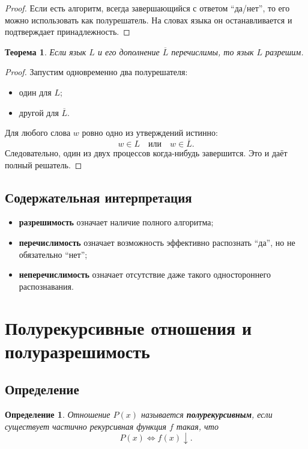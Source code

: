 \documentclass[12pt,a4paper]{article}
\newtheorem{definition}{Определение}
\newtheorem{theorem}{Теорема}
\begin{document}
\begin{proof}
Если есть алгоритм, всегда завершающийся с ответом ``да/нет'', то его можно использовать как полурешатель. На словах языка он останавливается и подтверждает принадлежность.
\end{proof}

\begin{theorem}
Если язык $L$ и его дополнение $\overline L$ перечислимы, то язык $L$ разрешим.
\end{theorem}

\begin{proof}
Запустим одновременно два полурешателя:
\begin{itemize}
    \item один для $L$;
    \item другой для $\overline L$.
\end{itemize}
Для любого слова $w$ ровно одно из утверждений истинно:
\[
w\in L \quad \text{или} \quad w\in \overline L.
\]
Следовательно, один из двух процессов когда-нибудь завершится. Это и даёт полный решатель.
\end{proof}

\subsection{Содержательная интерпретация}
\begin{itemize}
    \item \textbf{разрешимость} означает наличие полного алгоритма;
    \item \textbf{перечислимость} означает возможность эффективно распознать ``да'', но не обязательно ``нет'';
    \item \textbf{неперечислимость} означает отсутствие даже такого одностороннего распознавания.
\end{itemize}

\section{Полурекурсивные отношения и полуразрешимость}

\subsection{Определение}
\begin{definition}
Отношение $P(x)$ называется \textbf{полурекурсивным}, если существует частично рекурсивная функция $f$ такая, что
\[
P(x)\iff f(x)\downarrow.
\]
\end{definition}
\end{document}
